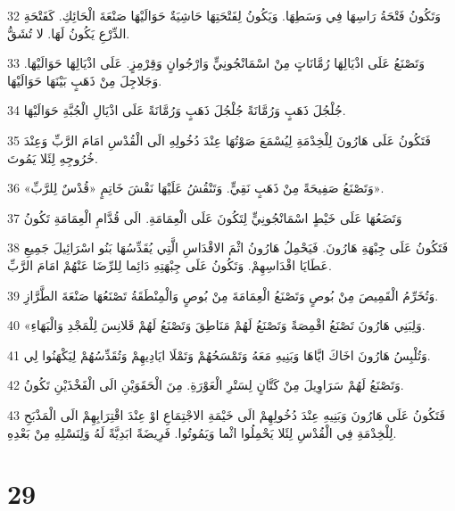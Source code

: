 \par 32 وَتَكُونُ فَتْحَةُ رَاسِهَا فِي وَسَطِهَا. وَيَكُونُ لِفَتْحَتِهَا حَاشِيَةٌ حَوَالَيْهَا صَنْعَةَ الْحَائِكِ. كَفَتْحَةِ الدِّرْعِ يَكُونُ لَهَا. لا تُشَقُّ.
\par 33 وَتَصْنَعُ عَلَى اذْيَالِهَا رُمَّانَاتٍ مِنْ اسْمَانْجُونِيٍّ وَارْجُوانٍ وَقِرْمِزٍ. عَلَى اذْيَالِهَا حَوَالَيْهَا. وَجَلاجِلَ مِنْ ذَهَبٍ بَيْنَهَا حَوَالَيْهَا.
\par 34 جُلْجُلَ ذَهَبٍ وَرُمَّانَةً جُلْجُلَ ذَهَبٍ وَرُمَّانَةً عَلَى اذْيَالِ الْجُبَّةِ حَوَالَيْهَا.
\par 35 فَتَكُونُ عَلَى هَارُونَ لِلْخِدْمَةِ لِيُسْمَعَ صَوْتُهَا عِنْدَ دُخُولِهِ الَى الْقُدْسِ امَامَ الرَّبِّ وَعِنْدَ خُرُوجِهِ لِئَلا يَمُوتَ.
\par 36 «وَتَصْنَعُ صَفِيحَةً مِنْ ذَهَبٍ نَقِيٍّ. وَتَنْقُشُ عَلَيْهَا نَقْشَ خَاتِمٍ «قُدْسٌ لِلرَّبِّ».
\par 37 وَتَضَعُهَا عَلَى خَيْطٍ اسْمَانْجُونِيٍّ لِتَكُونَ عَلَى الْعِمَامَةِ. الَى قُدَّامِ الْعِمَامَةِ تَكُونُ
\par 38 فَتَكُونُ عَلَى جِبْهَةِ هَارُونَ. فَيَحْمِلُ هَارُونُ اثْمَ الاقْدَاسِ الَّتِي يُقَدِّسُهَا بَنُو اسْرَائِيلَ جَمِيعِ عَطَايَا اقْدَاسِهِمْ. وَتَكُونُ عَلَى جِبْهَتِهِ دَائِما لِلرِّضَا عَنْهُمْ امَامَ الرَّبِّ.
\par 39 وَتُخَرِّمُ الْقَمِيصَ مِنْ بُوصٍ وَتَصْنَعُ الْعِمَامَةَ مِنْ بُوصٍ وَالْمِنْطَقَةُ تَصْنَعُهَا صَنْعَةَ الطَّرَّازِ.
\par 40 «وَلِبَنِي هَارُونَ تَصْنَعُ اقْمِصَةً وَتَصْنَعُ لَهُمْ مَنَاطِقَ وَتَصْنَعُ لَهُمْ قَلانِسَ لِلْمَجْدِ وَالْبَهَاءِ.
\par 41 وَتُلْبِسُ هَارُونَ اخَاكَ ايَّاهَا وَبَنِيهِ مَعَهُ وَتَمْسَحُهُمْ وَتَمْلَا ايَادِيهِمْ وَتُقَدِّسُهُمْ لِيَكْهَنُوا لِي.
\par 42 وَتَصْنَعُ لَهُمْ سَرَاوِيلَ مِنْ كَتَّانٍ لِسَتْرِ الْعَوْرَةِ. مِنَ الْحَقَوَيْنِ الَى الْفَخْذَيْنِ تَكُونُ.
\par 43 فَتَكُونُ عَلَى هَارُونَ وَبَنِيهِ عِنْدَ دُخُولِهِمْ الَى خَيْمَةِ الاجْتِمَاعِ اوْ عِنْدَ اقْتِرَابِهِمْ الَى الْمَذْبَحِ لِلْخِدْمَةِ فِي الْقُدْسِ لِئَلا يَحْمِلُوا اثْما وَيَمُوتُوا. فَرِيضَةً ابَدِيَّةً لَهُ وَلِنَسْلِهِ مِنْ بَعْدِهِ.

\chapter{29}

